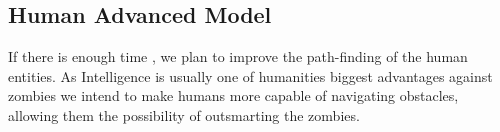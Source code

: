 \subsection{Human Advanced Model}
If there is enough time , we plan to improve the path-finding of the human entities. As Intelligence is usually one of humanities biggest advantages against zombies we intend to make humans more capable of navigating obstacles, allowing them the possibility of outsmarting the zombies.
\clearpage
\endinput
 
